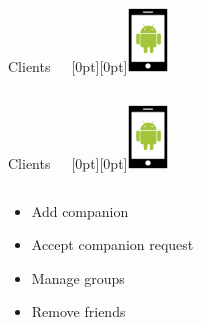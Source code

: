 \documentclass[11pt]{beamer}
\begin{document}
\begin{frame}{Clients~~~\raisebox{-10pt}[0pt][0pt]{\includegraphics[width=0.08\textwidth]{tech-stack-android}}}
\begin{columns}[T]
\begin{column}{.4\textwidth}
	\end{column}
\end{columns}
\end{frame}


\begin{frame}{Clients~~~\raisebox{-10pt}[0pt][0pt]{\includegraphics[width=0.08\textwidth]{tech-stack-android}}}

\begin{columns}[T]
	\begin{column}{.6\textwidth}
	\begin{itemize}
		\item Add companion
		\item Accept companion request
		\item Manage groups
		\item Remove friends
	\end{itemize}
	\end{column}
	\begin{column}{.4\textwidth}

\end{column}
\end{columns}
\end{frame}
\end{document}
